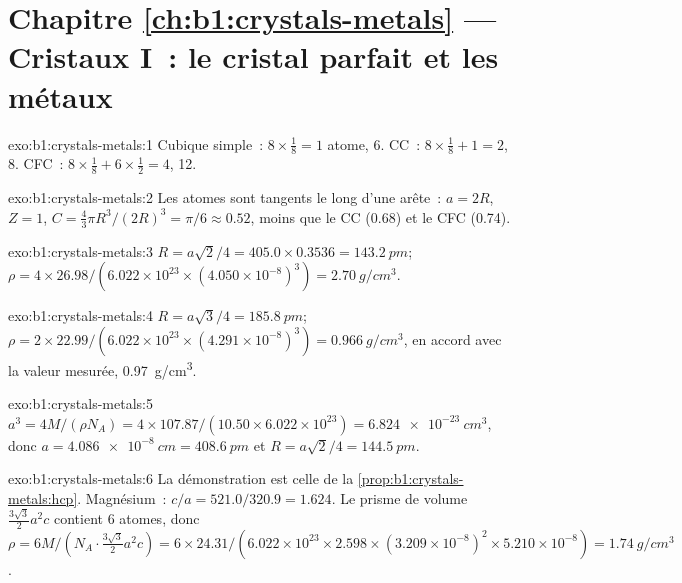 \section*{Chapitre \ref{ch:b1:crystals-metals} --- Cristaux I~: le cristal parfait et les métaux}

\begin{solution}{exo:b1:crystals-metals:1}
Cubique simple~: $8 \times \frac18 = 1$ atome,  6. CC~: $8 \times
\frac18 + 1 = 2$,  8. CFC~: $8 \times \frac18 + 6 \times
\frac12 = 4$,  12.
\end{solution}

\begin{solution}{exo:b1:crystals-metals:2}
Les atomes sont tangents le long d'une arête~: $a = 2R$, $Z = 1$, $C = \frac43\pi R^3/(2R)^3
= \pi/6 \approx 0.52$, moins que le CC (0.68) et le CFC (0.74).
\end{solution}

\begin{solution}{exo:b1:crystals-metals:3}
$R = a\sqrt2/4 = 405.0 \times 0.3536 = \qty{143.2}{pm}$;
$\rho = 4 \times 26.98/(6.022 \times 10^{23} \times (4.050 \times
10^{-8})^3) = \qty{2.70}{g/cm^3}$.
\end{solution}

\begin{solution}{exo:b1:crystals-metals:4}
$R = a\sqrt3/4 = \qty{185.8}{pm}$; $\rho = 2 \times 22.99/(6.022 \times
10^{23} \times (4.291 \times 10^{-8})^3) = \qty{0.966}{g/cm^3}$, en
accord avec la valeur mesurée, \qty{0.97}{g/cm^3}.
\end{solution}

\begin{solution}{exo:b1:crystals-metals:5}
$a^3 = 4M/(\rho N_A) = 4 \times 107.87/(10.50 \times 6.022 \times 10^{23}) =
\qty{6.824e-23}{cm^3}$, donc $a = \qty{4.086e-8}{cm} = \qty{408.6}{pm}$ et
$R = a\sqrt2/4 = \qty{144.5}{pm}$.
\end{solution}

\begin{solution}{exo:b1:crystals-metals:6}
La démonstration est celle de la \cref{prop:b1:crystals-metals:hcp}.
Magnésium~: $c/a = 521.0/320.9 = 1.624$. Le prisme de volume
$\frac{3\sqrt3}{2}a^2c$ contient 6 atomes, donc $\rho = 6M/(N_A \cdot
\frac{3\sqrt3}{2}a^2c) = 6 \times 24.31/(6.022 \times 10^{23} \times
2.598 \times (3.209 \times 10^{-8})^2 \times 5.210 \times 10^{-8}) =
\qty{1.74}{g/cm^3}$.
\end{solution}

